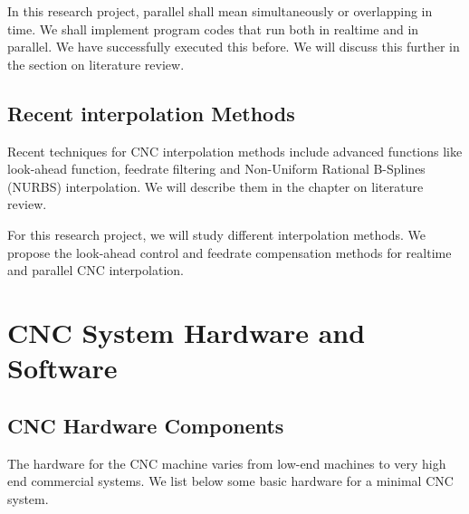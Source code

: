 \begin{tcolorbox}[colback=green!15!white, colframe=red!75!black, title=Research consideration no. 6]
\justifying
In this research project, parallel shall mean simultaneously or overlapping in time. We shall implement program codes that run both in realtime and in parallel. We have successfully executed this before. We will discuss this further in the section on literature review.
\end{tcolorbox} 

\pagebreak
\subsection{Recent interpolation Methods}

Recent techniques for CNC interpolation methods include advanced functions like look-ahead function, feedrate filtering  and Non-Uniform Rational B-Splines (NURBS) interpolation. We will describe them in the chapter on literature review.

\begin{tcolorbox}[colback=green!15!white, colframe=red!75!black, title=Research consideration no. 7]
For this research project, we will study different interpolation methods. We propose the look-ahead control and feedrate compensation methods for realtime and parallel CNC interpolation.
\end{tcolorbox}


\clearpage
\pagebreak


\clearpage
\pagebreak


\clearpage
\pagebreak

\section{CNC System Hardware and Software}

\subsection{CNC Hardware Components}

The hardware for the CNC machine varies from low-end machines to very high end commercial systems. We list below some basic hardware for a minimal CNC system.


